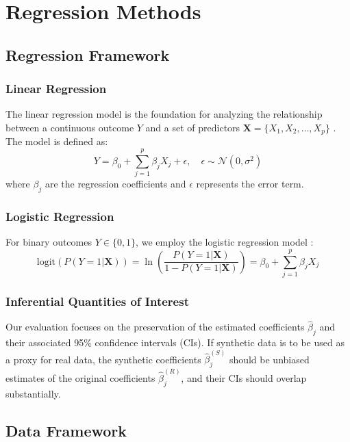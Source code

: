\chapter{Regression Methods}
\label{chap:regression-methods}

\section{Regression Framework}
\label{sec:reg-framework}

\subsection{Linear Regression}
The linear regression model is the foundation for analyzing the relationship between a continuous outcome $Y$ and a set of predictors $\mathbf{X} = \{X_1, X_2, \dots, X_p\}$ \cite{mccullagh1989}. The model is defined as:
\begin{equation}
    Y = \beta_0 + \sum_{j=1}^{p} \beta_j X_j + \epsilon, \quad \epsilon \sim \mathcal{N}(0, \sigma^2)
\end{equation}
where $\beta_j$ are the regression coefficients and $\epsilon$ represents the error term.

\subsection{Logistic Regression}
For binary outcomes $Y \in \{0, 1\}$, we employ the logistic regression model \cite{hosmer2013}:
\begin{equation}
    \text{logit}(P(Y=1|\mathbf{X})) = \ln\left(\frac{P(Y=1|\mathbf{X})}{1-P(Y=1|\mathbf{X})}\right) = \beta_0 + \sum_{j=1}^{p} \beta_j X_j
\end{equation}

\subsection{Inferential Quantities of Interest}
Our evaluation focuses on the preservation of the estimated coefficients $\hat{\beta}_j$ and their associated 95\% confidence intervals (CIs). If synthetic data is to be used as a proxy for real data, the synthetic coefficients $\hat{\beta}_j^{(S)}$ should be unbiased estimates of the original coefficients $\hat{\beta}_j^{(R)}$, and their CIs should overlap substantially.

\section{Data Framework}
\label{sec:reg-data-framework}

